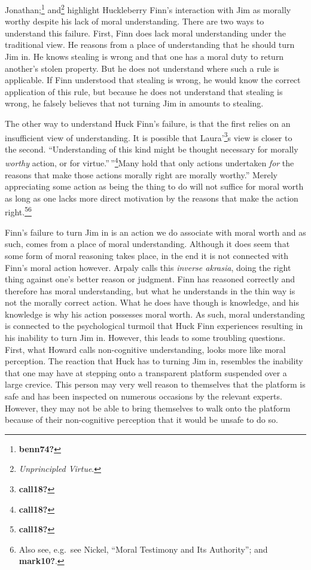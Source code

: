 \documentclass[
  12pt,
]{book}
\theoremstyle{definition}
\theoremstyle{definition}
\theoremstyle{definition}
\theoremstyle{definition}
\theoremstyle{remark}
\begin{document}
Jonathan;\footnote{\textbf{benn74?}} and\footnote{\emph{Unprincipled {Virtue}}.} highlight Huckleberry Finn's interaction with Jim as morally worthy despite his lack of moral understanding. There are two ways to understand this failure. First, Finn does lack moral understanding under the traditional view. He reasons from a place of understanding that he should turn Jim in. He knows stealing is wrong and that one has a moral duty to return another's stolen property. But he does not understand where such a rule is applicable. If Finn understood that stealing is wrong, he would know the correct application of this rule, but because he does not understand that stealing is wrong, he falsely believes that not turning Jim in amounts to stealing.

The other way to understand Huck Finn's failure, is that the first relies on an insufficient view of understanding. It is possible that Laura'\footnote{\textbf{call18?}}s view is closer to the second. ``Understanding of this kind might be thought necessary for morally \emph{worthy} action, or for virtue.''\,''\footnote{\textbf{call18?}}Many hold that only actions undertaken \emph{for} the reasons that make those actions morally right are morally worthy.'' Merely appreciating some action as being the thing to do will not suffice for moral worth as long as one lacks more direct motivation by the reasons that make the action right.\footnote{\textbf{call18?}}\footnote{Also see, e.g.~see Nickel, {``Moral {Testimony} and Its {Authority}''}; and \textbf{mark10?}.}

Finn's failure to turn Jim in is an action we do associate with moral worth and as such, comes from a place of moral understanding. Although it does seem that some form of moral reasoning takes place, in the end it is not connected with Finn's moral action however. Arpaly calls this \emph{inverse akrasia}, doing the right thing against one's better reason or judgment. Finn has reasoned correctly and therefore has moral understanding, but what he understands in the thin way is not the morally correct action. What he does have though is knowledge, and his knowledge is why his action possesses moral worth. As such, moral understanding is connected to the psychological turmoil that Huck Finn experiences resulting in his inability to turn Jim in. However, this leads to some troubling questions. First, what Howard calls non-cognitive understanding, looks more like moral perception. The reaction that Huck has to turning Jim in, resembles the inability that one may have at stepping onto a transparent platform suspended over a large crevice. This person may very well reason to themselves that the platform is safe and has been inspected on numerous occasions by the relevant experts. However, they may not be able to bring themselves to walk onto the platform because of their non-cognitive perception that it would be unsafe to do so.
\end{document}
